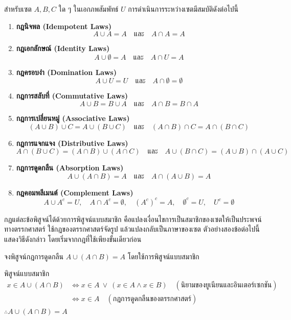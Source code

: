 \begin{law}
สำหรับเซต $A, B, C$ ใด ๆ ในเอกภพสัมพัทธ์ $U$ การดำเนินการระหว่างเซตมีสมบัติดังต่อไปนี้

\begin{enumerate}
    \item \textbf{กฎนิจพล (Idempotent Laws)}
    \[ A \cup A = A \quad \text{และ} \quad A \cap A = A \]
    \item \textbf{กฎเอกลักษณ์ (Identity Laws)}
    \[ A \cup \emptyset = A \quad \text{และ} \quad A \cap U = A \]
    \item \textbf{กฎครอบงำ (Domination Laws)}
    \[ A \cup U = U \quad \text{และ} \quad A \cap \emptyset = \emptyset \]
    \item \textbf{กฎการสลับที่ (Commutative Laws)}
    \[ A \cup B = B \cup A \quad \text{และ} \quad A \cap B = B \cap A \]
    \item \textbf{กฎการเปลี่ยนหมู่ (Associative Laws)}
    \[ (A \cup B) \cup C = A \cup (B \cup C) \quad \text{และ} \quad (A \cap B) \cap C = A \cap (B \cap C) \]
    \item \textbf{กฎการแจกแจง (Distributive Laws)}
    \[ A \cap (B \cup C) = (A \cap B) \cup (A \cap C) \quad \text{และ} \quad A \cup (B \cap C) = (A \cup B) \cap (A \cup C) \]
    \item \textbf{กฎการดูดกลืน (Absorption Laws)}
    \[ A \cup (A \cap B) = A \quad \text{และ} \quad A \cap (A \cup B) = A \]
    \item \textbf{กฎคอมพลีเมนต์ (Complement Laws)}
    \[ A \cup A^c = U, \quad A \cap A^c = \emptyset, \quad (A^c)^c = A, \quad \emptyset^c = U, \quad U^c = \emptyset \]
\end{enumerate}
\label{law:set-algebraic-laws}
\end{law}

กฎแต่ละข้อพิสูจน์ได้ด้วยการพิสูจน์แบบสมาชิก คือแปลงเงื่อนไขการเป็นสมาชิกของเซตให้เป็นประพจน์ทางตรรกศาสตร์ ใช้กฎของตรรกศาสตร์จัดรูป แล้วแปลงกลับเป็นภาษาของเซต ตัวอย่างสองข้อต่อไปนี้แสดงวิธีดังกล่าว โดยเริ่มจากกฎที่ใช้เพียงขั้นเดียวก่อน

\begin{ex}
\label{ex:proof-absorption}
จงพิสูจน์กฎการดูดกลืน $A \cup (A \cap B) = A$ โดยใช้การพิสูจน์แบบสมาชิก
\end{ex}
\begin{solution}
พิสูจน์แบบสมาชิก
\begin{align*}
x \in A \cup (A \cap B)
&\Leftrightarrow x \in A \ \lor\ (x \in A \land x \in B) \quad (\text{นิยามของยูเนียนและอินเตอร์เซกชัน})\\
&\Leftrightarrow x \in A \quad (\text{กฎการดูดกลืนของตรรกศาสตร์})
\end{align*}
$\therefore A \cup (A \cap B) = A$ \solhere
\end{solution}

